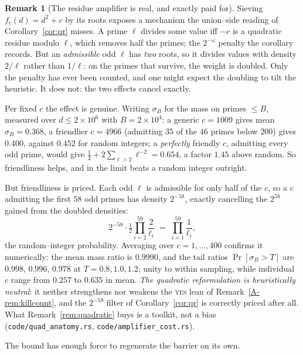 \documentclass[11pt]{article}
\theoremstyle{definition}
\newtheorem{remark}[theorem]{Remark}
\begin{document}
\begin{remark}[The residue amplifier is real, and exactly paid for]\label{rem:amplifier}
Sieving $f_c(d)=d^2+c$ by its roots exposes a mechanism the union--side reading of
Corollary~\ref{cor:qr} misses. A prime $\ell$ divides some value iff $-c$ is a quadratic residue
modulo $\ell$, which removes half the primes; the $2^{-\omega}$ penalty the corollary records.
But an \emph{admissible} odd $\ell$ has \emph{two} roots, so it divides values with density
$2/\ell$ rather than $1/\ell$: on the primes that survive, the weight is doubled. Only the penalty
has ever been counted, and one might expect the doubling to tilt the heuristic. It does not: the
two effects cancel exactly.

Per fixed $c$ the effect is genuine. Writing $\sigma_B$ for the mass on primes $\le B$, measured
over $d\le2\times10^6$ with $B=2\times10^4$: a generic $c=1009$ gives mean $\sigma_B=0.368$, a
friendlier $c=4966$ (admitting $35$ of the $46$ primes below $200$) gives $0.400$, against $0.452$
for random integers; a \emph{perfectly} friendly $c$, admitting every odd prime, would give
$\tfrac14+2\sum_{\ell>2}\ell^{-2}=0.654$, a factor $1.45$ above random. So friendliness helps, and
in the limit beats a random integer outright.

But friendliness is priced. Each odd $\ell$ is admissible for only half of the $c$, so a $c$
admitting the first $58$ odd primes has density $2^{-58}$, exactly cancelling the $2^{58}$ gained
from the doubled densities:
\[ 2^{-58}\cdot\tfrac12\prod_{i=2}^{59}\frac2{\ell_i}\;=\;\prod_{i=1}^{59}\frac1{\ell_i}, \]
the random--integer probability. Averaging over $c=1,\dots,400$ confirms it numerically: the mean
mass ratio is $0.9990$, and the tail ratios $\Pr[\sigma_B>T]$ are $0.998$, $0.996$, $0.978$ at
$T=0.8,1.0,1.2$; unity to within sampling, while individual $c$ range from $0.257$ to $0.635$
in mean. \emph{The quadratic reformulation is heuristically neutral}: it neither strengthens nor
weakens the \textsc{yes} lean of Remark~\ref{A-rem:killcount}, and the $2^{-59}$ filter of
Corollary~\ref{cor:qr} is correctly priced after all. What
Remark~\ref{rem:quadratic} buys is a toolkit, not a bias (\texttt{code/quad\_anatomy.rs},
\texttt{code/amplifier\_cost.rs}).
\end{remark}

The bound has enough force to regenerate the barrier on its own.
\end{document}
